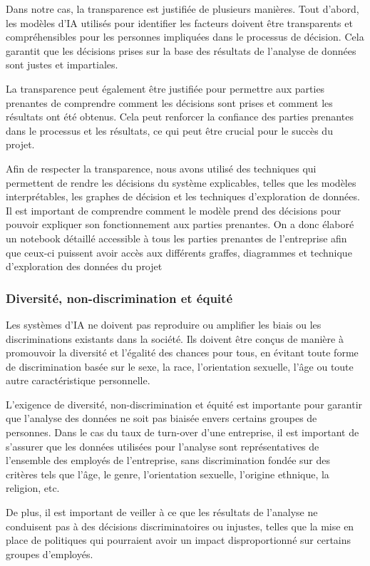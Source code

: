 Dans notre cas, la transparence est justifiée de plusieurs manières. Tout d'abord, les modèles d'IA utilisés pour identifier les facteurs doivent être transparents et compréhensibles pour les personnes impliquées dans le processus de décision. Cela garantit que les décisions prises sur la base des résultats de l'analyse de données sont justes et impartiales. 

La transparence peut également être justifiée pour permettre aux parties prenantes de comprendre comment les décisions sont prises et comment les résultats ont été obtenus. Cela peut renforcer la confiance des parties prenantes dans le processus et les résultats, ce qui peut être crucial pour le succès du projet. 

Afin de respecter la transparence, nous avons utilisé des techniques qui permettent de rendre les décisions du système explicables, telles que les modèles interprétables, les graphes de décision et les techniques d'exploration de données. Il est important de comprendre comment le modèle prend des décisions pour pouvoir expliquer son fonctionnement aux parties prenantes. On a donc élaboré un notebook détaillé accessible à tous les parties prenantes de l'entreprise afin que ceux-ci puissent avoir accès aux différents graffes, diagrammes et technique d'exploration des données du projet 


\subsubsection{Diversité, non-discrimination et équité}
Les systèmes d'IA ne doivent pas reproduire ou amplifier les biais ou les discriminations existants dans la société. Ils doivent être conçus de manière à promouvoir la diversité et l'égalité des chances pour tous, en évitant toute forme de discrimination basée sur le sexe, la race, l'orientation sexuelle, l'âge ou toute autre caractéristique personnelle. 

L'exigence de diversité, non-discrimination et équité est importante pour garantir que l'analyse des données ne soit pas biaisée envers certains groupes de personnes. Dans le cas du taux de turn-over d'une entreprise, il est important de s'assurer que les données utilisées pour l'analyse sont représentatives de l'ensemble des employés de l'entreprise, sans discrimination fondée sur des critères tels que l'âge, le genre, l'orientation sexuelle, l'origine ethnique, la religion, etc.  

De plus, il est important de veiller à ce que les résultats de l'analyse ne conduisent pas à des décisions discriminatoires ou injustes, telles que la mise en place de politiques qui pourraient avoir un impact disproportionné sur certains groupes d'employés.  

